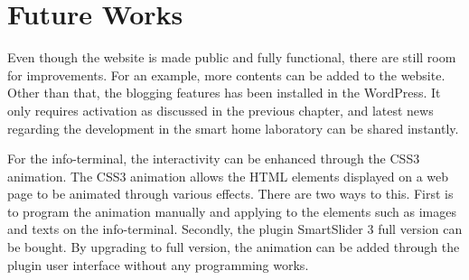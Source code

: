 \section{Future Works}
Even though the website is made public and fully functional, there are still room for improvements. For an example, more contents can be added to the website. Other than that, the blogging features has been installed in the WordPress. It only requires activation as discussed in the previous chapter, and latest news regarding the development in the smart home laboratory can be shared instantly.

For the info-terminal, the interactivity can be enhanced through the CSS3 animation. The CSS3 animation allows the HTML elements displayed on a web page to be animated through various effects. There are two ways to this. First is to program the animation manually and applying to the elements such as images and texts on the info-terminal. Secondly, the plugin SmartSlider 3 full version can be bought. By upgrading to full version, the animation can be added through the plugin user interface without any programming works.

